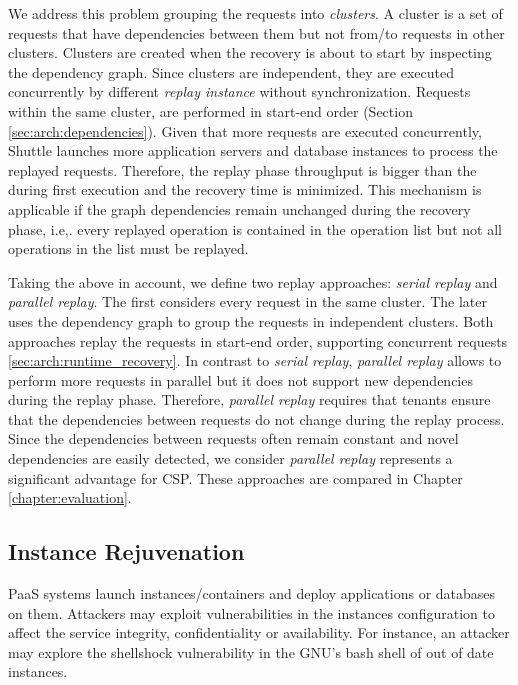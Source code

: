 We address this problem grouping the requests into \emph{clusters}. A cluster is a set of requests that have dependencies between them but not from/to requests in other clusters. Clusters are created when the recovery is about to start by inspecting the dependency graph. Since clusters are independent, they are executed concurrently by different \emph{replay instance} without synchronization. Requests within the same cluster, are performed in start-end order (Section \ref{sec:arch:dependencies}). Given that more requests are executed concurrently, Shuttle launches more application servers and database instances to process the replayed requests. Therefore, the replay phase throughput is bigger than the during first execution and the recovery time is minimized. This mechanism is applicable if the graph dependencies remain unchanged during the recovery phase, i.e,. every replayed operation is contained in the operation list but not all operations in the list must be replayed.

Taking the above in account, we define two replay approaches: \emph{serial replay} and \emph{parallel replay}. The first considers every request in the same cluster. The later uses the dependency graph to group the requests in independent clusters. Both approaches replay the requests in start-end order, supporting concurrent requests \ref{sec:arch:runtime_recovery}. In contrast to \emph{serial replay}, \emph{parallel replay} allows to perform more requests in parallel but it does not support new dependencies during the replay phase. Therefore, \emph{parallel replay} requires that tenants ensure that the dependencies between requests do not change during the replay process. Since the dependencies between requests often remain constant and novel dependencies are easily detected, we consider \emph{parallel replay} represents a significant advantage for \acf{CSP}. These approaches are compared in Chapter \ref{chapter:evaluation}.




\subsection{Instance Rejuvenation}
\label{sec:arch:image_rejuvenation}

\ac{PaaS} systems launch instances/containers and deploy applications or databases on them. Attackers may exploit vulnerabilities in the instances configuration to affect the service integrity, confidentiality or availability. For instance, an attacker may explore the shellshock vulnerability in the GNU's bash shell of out of date instances.

